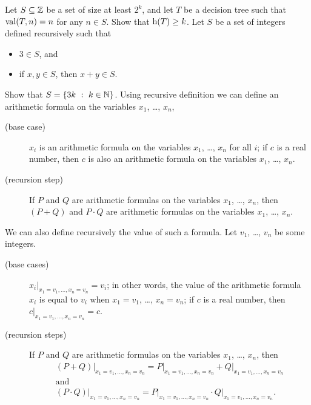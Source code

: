 \begin{chapterendexercises}
  \exercise[recommended] Let $S \subseteq {\mathbb{Z}}$ be a set of size at least $2^k$,
    and let $T$ be a decision tree such that $\mathrm{val}({T}, {n}) = n$ for any $n
    \in S$. Show that $\DTHeight{T} \ge k$.
  \exercise[recommended] Let $S$ be a set of integers defined recursively such
    that
    \begin{itemize}
      \item $3 \in S$, and 
      \item if $x, y \in S$, then $x + y \in S$.
    \end{itemize}
    Show that $S = \set[k \in \N]{3k}$.
  \exercise[recommended]
    Using recursive definition we can define an arithmetic formula on the
    variables $x_1$, \dots, $x_n$,
    \begin{description}
      \item [(base case)] $x_i$ is an arithmetic formula on the variables $x_1$,
        \dots, $x_n$ for all $i$; if $c$ is a real number, then $c$ is also an
        arithmetic formula on the variables $x_1$, \dots, $x_n$.
      \item[(recursion step)] If $P$ and $Q$ are arithmetic formulas on the
        variables $x_1$, \dots, $x_n$, then $(P + Q)$ and $P \cdot Q$ are
        arithmetic formulas on the variables $x_1$, \dots, $x_n$.
    \end{description}

    We can also define recursively the value of such a formula.
    Let $v_1$, \dots, $v_n$ be some integers.
    \begin{description}
      \item[(base cases)] $x_i\big\rvert_{x_1 = v_1, \dots, x_n = v_n} = v_i$;
        in other words, the value of the arithmetic formula $x_i$ is equal to
        $v_i$ when $x_1 = v_1$, \dots, $x_n = v_n$; if $c$ is a real number,
        then $c\rvert_{x_1 = v_1, \dots, x_n = v_n} = c$.
      \item[(recursion steps)] If $P$ and $Q$ are arithmetic formulas on the
        variables $x_1$, \dots, $x_n$, then
        \begin{gather*}
          (P + Q)\big\rvert_{x_1 = v_1, \dots, x_n = v_n} =
          P\big\rvert_{x_1 = v_1, \dots, x_n = v_n} +
          Q\big\rvert_{x_1 = v_1, \dots, x_n = v_n} \\        
        \text{and} \\        
         (P \cdot Q)\big\rvert_{x_1 = v_1, \dots, x_n = v_n} =
         P\big\rvert_{x_1 = v_1, \dots, x_n = v_n} \cdot
         Q\big\rvert_{x_1 = v_1, \dots, x_n = v_n}.
        \end{gather*}
    \end{description}


\end{chapterendexercises}
